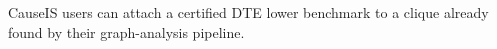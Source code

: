 CauseIS users can attach a certified DTE lower benchmark to a clique already found by their graph-analysis pipeline.